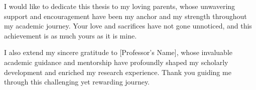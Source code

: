 
\begin{dedication}

    I would like to dedicate this thesis to my loving parents, whose unwavering support and encouragement have been my anchor and my strength throughout my academic journey. Your love and sacrifices have not gone unnoticed, and this achievement is as much yours as it is mine.
    
    I also extend my sincere gratitude to [Professor's Name], whose invaluable academic guidance and mentorship have profoundly shaped my scholarly development and enriched my research experience. Thank you guiding me through this challenging yet rewarding journey.
    
\end{dedication}